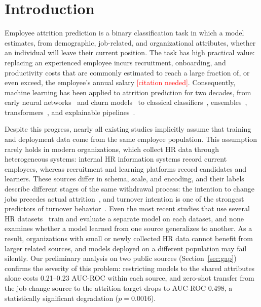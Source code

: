 \documentclass[runningheads]{llncs}
\newcommand{\tbd}[1]{\textcolor{red}{#1}}
\begin{document}
\section{Introduction}
Employee attrition prediction is a binary classification task in which a model estimates, from demographic, job-related, and organizational attributes, whether an individual will leave their current position. The task has high practical value: replacing an experienced employee incurs recruitment, onboarding, and productivity costs that are commonly estimated to reach a large fraction of, or even exceed, the employee's annual salary \tbd{[citation needed]}. Consequently, machine learning has been applied to attrition prediction for two decades, from early neural networks~\cite{sexton2005} and churn models~\cite{saradhi2011} to classical classifiers~\cite{jain2020}, ensembles~\cite{alsheref2022,chung2023}, transformers~\cite{li2023}, and explainable pipelines~\cite{mohiuddin2023,baydili2025,alali2026}.

Despite this progress, nearly all existing studies implicitly assume that training and deployment data come from the same employee population. This assumption rarely holds in modern organizations, which collect HR data through heterogeneous systems: internal HR information systems record current employees, whereas recruitment and learning platforms record candidates and learners. These sources differ in schema, scale, and encoding, and their labels describe different stages of the same withdrawal process: the intention to change jobs precedes actual attrition~\cite{mobley1977}, and turnover intention is one of the strongest predictors of turnover behavior~\cite{griffeth2000}. Even the most recent studies that use several HR datasets~\cite{baydili2025,alali2026} train and evaluate a separate model on each dataset, and none examines whether a model learned from one source generalizes to another. As a result, organizations with small or newly collected HR data cannot benefit from larger related sources, and models deployed on a different population may fail silently. Our preliminary analysis on two public sources (Section~\ref{sec:gap}) confirms the severity of this problem: restricting models to the shared attributes alone costs 0.21--0.23 AUC-ROC within each source, and zero-shot transfer from the job-change source to the attrition target drops to AUC-ROC 0.498, a statistically significant degradation ($p=0.0016$).
\end{document}
